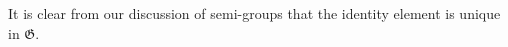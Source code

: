 It is clear from our discussion of semi-groups that the identity element is unique in $\mathfrak{G}$.
